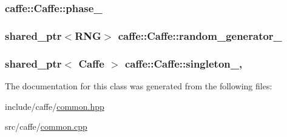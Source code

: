 \hypertarget{classcaffe_1_1_caffe_ad919ccd26b71547e009bac6debfcc05a}{
\subsubsection[{phase\+\_\+}]{ caffe\+::\+Caffe\+::phase\+\_\+\hspace{0.3cm}{\ttfamily [protected]}}}\label{classcaffe_1_1_caffe_ad919ccd26b71547e009bac6debfcc05a}
\hypertarget{classcaffe_1_1_caffe_a0c1d6159f6add0ae470af9a09836d979}{
\subsubsection[{random\+\_\+generator\+\_\+}]{\setlength{\rightskip}{0pt plus 5cm}shared\+\_\+ptr$<${\bf R\+N\+G}$>$ caffe\+::\+Caffe\+::random\+\_\+generator\+\_\+\hspace{0.3cm}{\ttfamily [protected]}}}\label{classcaffe_1_1_caffe_a0c1d6159f6add0ae470af9a09836d979}
\hypertarget{classcaffe_1_1_caffe_a74e06bec4b81b15e2064a216f33467b6}{
\subsubsection[{singleton\+\_\+}]{\setlength{\rightskip}{0pt plus 5cm}shared\+\_\+ptr$<$ {\bf Caffe} $>$ caffe\+::\+Caffe\+::singleton\+\_\+\hspace{0.3cm}{\ttfamily [static]}, {\ttfamily [protected]}}}\label{classcaffe_1_1_caffe_a74e06bec4b81b15e2064a216f33467b6}


The documentation for this class was generated from the following files\+:\begin{DoxyCompactItemize}
\item 
include/caffe/\hyperlink{common_8hpp}{common.\+hpp}\item 
src/caffe/\hyperlink{common_8cpp}{common.\+cpp}\end{DoxyCompactItemize}
